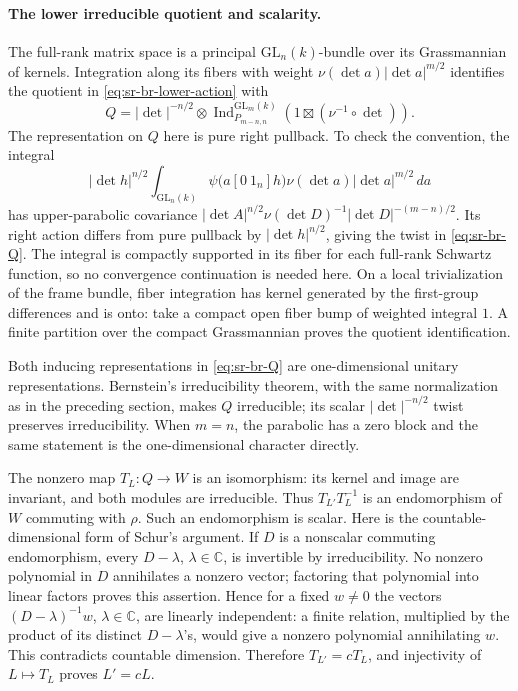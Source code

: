 \paragraph{The lower irreducible quotient and scalarity.}
The full-rank matrix space is a principal
\(\mathrm{GL}_n(k)\)-bundle over its Grassmannian of kernels.
Integration along its fibers with weight
\(\nu(\det a)|\det a|^{m/2}\) identifies the quotient in
\eqref{eq:sr-br-lower-action} with
\[
 Q=|\det|^{-n/2}\otimes
       \operatorname{Ind}_{P_{m-n,n}}^{\mathrm{GL}_m(k)}
                    (1\boxtimes(\nu^{-1}\circ\det)).
 \label{eq:sr-br-Q}
\]
The representation on \(Q\) here is pure right pullback.
To check the convention, the integral
\[
 |\det h|^{n/2}\!
 \int_{\mathrm{GL}_n(k)}
       \psi\bigl(a[0\ 1_n]h\bigr)\nu(\det a)|\det a|^{m/2}\,da
\]
has upper-parabolic covariance
\(|\det A|^{n/2}\nu(\det D)^{-1}|\det D|^{-(m-n)/2}\).
Its right action differs from pure pullback by
\(|\det h|^{n/2}\), giving the twist in \eqref{eq:sr-br-Q}.
The integral is compactly supported in its fiber for each
full-rank Schwartz function, so no convergence continuation is
needed here.  On a local trivialization of the frame bundle,
fiber integration has kernel generated by the first-group
differences and is onto: take a compact open fiber bump of
weighted integral \(1\).  A finite partition over the compact
Grassmannian proves the quotient identification.

Both inducing representations in \eqref{eq:sr-br-Q} are
one-dimensional unitary representations.  Bernstein's
irreducibility theorem, with the same normalization as in the
preceding section, makes \(Q\) irreducible; its scalar
\(|\det|^{-n/2}\) twist preserves irreducibility.
When \(m=n\), the parabolic has a zero block and the same
statement is the one-dimensional character directly.

The nonzero map \(T_L:Q\to W\) is an isomorphism: its kernel
and image are invariant, and both modules are irreducible.
Thus \(T_{L'}T_L^{-1}\) is an endomorphism of \(W\) commuting
with \(\rho\).  Such an endomorphism is scalar.
Here is the countable-dimensional form of Schur's argument.
If \(D\) is a nonscalar commuting endomorphism, every
\(D-\lambda\), \(\lambda\in\mathbb C\), is invertible by
irreducibility.  No nonzero polynomial in \(D\) annihilates
a nonzero vector; factoring that polynomial into linear
factors proves this assertion.  Hence for a fixed \(w\ne0\)
the vectors \((D-\lambda)^{-1}w\), \(\lambda\in\mathbb C\),
are linearly independent: a finite relation, multiplied by
the product of its distinct \(D-\lambda\)'s, would give a
nonzero polynomial annihilating \(w\).
This contradicts countable dimension.
Therefore \(T_{L'}=cT_L\), and injectivity of
\(L\mapsto T_L\) proves \(L'=cL\).


